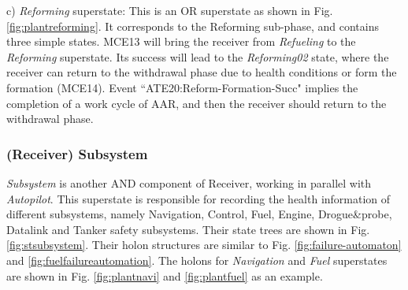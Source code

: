 c) \textit{Reforming} superstate: This is an OR superstate as shown in Fig. \ref{fig:plantreforming}. It corresponds to the Reforming sub-phase, and contains three simple states.  MCE13 will bring the receiver from \textit{Refueling} to the \textit{Reforming} superstate. Its success will lead to the \textit{Reforming02} state, where the receiver can return to the withdrawal phase due to health conditions or form the formation (MCE14). Event ``ATE20:Reform-Formation-Succ" implies the completion of a work cycle of AAR, and then the receiver should return to the withdrawal phase.

\subsubsection{(Receiver) Subsystem}
\textit{Subsystem} is another AND component of Receiver, working in parallel with \textit{Autopilot}. This  superstate is responsible for recording the health information of different subsystems, namely Navigation, Control, Fuel, Engine, Drogue\&probe, Datalink and Tanker safety subsystems. Their state trees are shown in Fig. \ref{fig:stsubsystem}. Their holon structures are similar to Fig. \ref{fig:failure-automaton} and \ref{fig:fuelfailureautomation}. The holons for \textit{Navigation} and \textit{Fuel} superstates are shown in Fig. \ref{fig:plantnavi} and \ref{fig:plantfuel} as an example.

